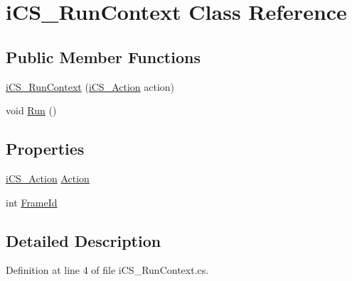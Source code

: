 \hypertarget{classi_c_s___run_context}{\section{i\+C\+S\+\_\+\+Run\+Context Class Reference}
\label{classi_c_s___run_context}
}
\subsection*{Public Member Functions}
\begin{DoxyCompactItemize}
\item 
\hyperlink{classi_c_s___run_context_a827bbe86d7cf784f0d088c5a5fd3ecd7}{i\+C\+S\+\_\+\+Run\+Context} (\hyperlink{classi_c_s___action}{i\+C\+S\+\_\+\+Action} action)
\item 
void \hyperlink{classi_c_s___run_context_ab1be7fb031e6efd92a9405f9470de4a7}{Run} ()
\end{DoxyCompactItemize}
\subsection*{Properties}
\begin{DoxyCompactItemize}
\item 
\hyperlink{classi_c_s___action}{i\+C\+S\+\_\+\+Action} \hyperlink{classi_c_s___run_context_a472e4d7df7c46bd670ca5ad170609ab7}{Action}
\item 
int \hyperlink{classi_c_s___run_context_a7325152d5dafb5908db84e3c1597355a}{Frame\+Id}
\end{DoxyCompactItemize}


\subsection{Detailed Description}


Definition at line 4 of file i\+C\+S\+\_\+\+Run\+Context.\+cs.



